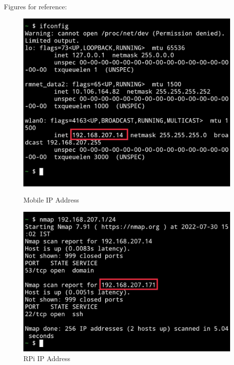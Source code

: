 \documentclass{article}
\begin{document}
Figures for reference:
\begin{figure}[!htb]
              \includegraphics[width=\linewidth]{./figs/termux/ifconfig.jpeg}
              \caption{Mobile IP Address}\label{fig:awesome_image1}
            \endminipage\hfill
              \includegraphics[width=\linewidth]{./figs/termux/nmap.jpeg}
              \caption{RPi IP Address}\label{fig:awesome_image2}
            \endminipage\hfill

\end{figure}
\end{document}
